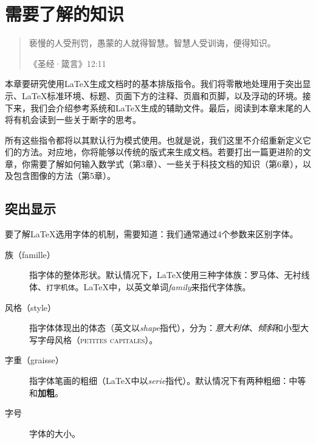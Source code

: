 \chapter{需要了解的知识}

\begin{quote}
    亵慢的人受刑罚，愚蒙的人就得智慧。智慧人受训诲，便得知识。
    
    \hfill《圣经·箴言》12:11
\end{quote}


本章要研究使用\LaTeX 生成文档时的基本排版指令。我们将零散地处理用于突出显示、\LaTeX 标准环境、标题、页面下方的注释、页眉和页脚，以及浮动的环境。接下来，我们会介绍参考系统和\LaTeX 生成的辅助文件。最后，阅读到本章末尾的人将有机会读到一些关于断字的思考。

所有这些指令都将以其默认行为模式使用。也就是说，我们这里不介绍重新定义它们的方法。对应地，你将能够以传统的版式来生成文档。若要打出一篇更进阶的文章，你需要了解如何输入数学式（第3章）、一些关于科技文档的知识（第6章），以及包含图像的方法（第5章）。

\section{突出显示}

要了解\LaTeX 选用字体的机制，需要知道：我们通常通过4个参数来区别字体。

\begin{description}
  \item[族（famille）] 指字体的整体形状。默认情况下，\LaTeX 使用三种字体族：罗马体、\textsf{无衬线体}、\texttt{打字机体}。\LaTeX 中，以英文单词\emph{family}来指代字体族。
  \item[风格（style）] 指字体体现出的体态（英文以\emph{shape}指代），分为：\textit{意大利体}、\textsl{倾斜}和\textsc{小型大写字母风格（petites capitales）}。
  \item [字重（graisse）]指字体笔画的粗细（\LaTeX 中以\emph{serie}指代）。默认情况下有两种粗细：中等和\textbf{加粗}。
  \item [字号]字{\large 体}{\Large 的}{\LARGE 大}{\small 小}。
\end{description}


